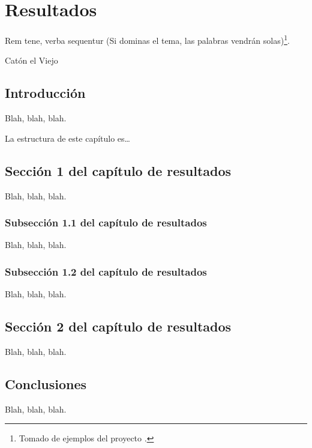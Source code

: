 
\chapter{Resultados}
\label{cha:resultados}


\begin{FraseCelebre}
  \begin{Frase}
    Rem tene, verba sequentur (Si dominas el tema, las palabras vendrán
    solas)\footnote{Tomado de ejemplos del proyecto \texis{}.}.
  \end{Frase}
  \begin{Fuente}
    Catón el Viejo
  \end{Fuente}
\end{FraseCelebre}

\section{Introducción}
\label{sec:results-introduction}

Blah, blah, blah.

La estructura de este capítulo es\ldots


\section{Sección 1 del capítulo de resultados}
\label{sec:results-1}

Blah, blah, blah.


\subsection{Subsección 1.1 del capítulo de resultados}
\label{sec:results-11}

Blah, blah, blah.


\subsection{Subsección 1.2 del capítulo de resultados}
\label{sec:results-12}

Blah, blah, blah.




\section{Sección 2 del capítulo de resultados}
\label{sec:results-2}

Blah, blah, blah.




\section{Conclusiones}
\label{sec:results-conclusions}

Blah, blah, blah.


